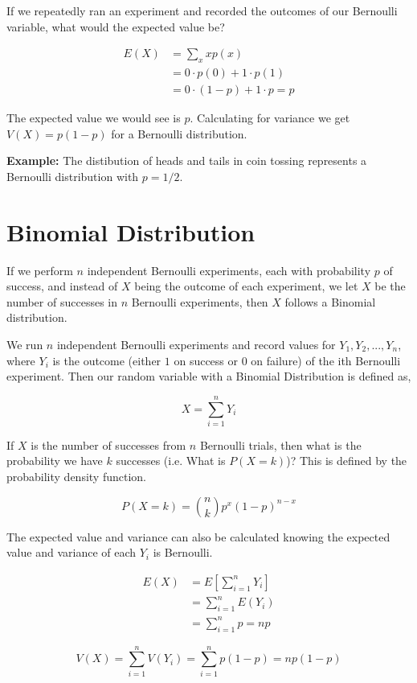 If we repeatedly ran an experiment and recorded the outcomes of our Bernoulli variable, what would the expected value be?

\begin{align*}
	E(X) & = \sum_{x}xp(x)\\
	& = 0\cdot p(0) + 1\cdot p(1) \\
	& = 0\cdot (1-p) + 1\cdot p = p
\end{align*}

The expected value we would see is $p$. Calculating for variance we get $V(X)=p(1-p)$ for a Bernoulli distribution.\newline \par

\textbf{Example:} The distibution of heads and tails in coin tossing represents a Bernoulli distribution with $p=1/2$.


\section{Binomial Distribution}
If we perform $n$ independent Bernoulli experiments, each with probability $p$ of success, and instead of $X$ being the outcome of each experiment, we let $X$ be the
number of successes in $n$ Bernoulli experiments, then $X$ follows a Binomial distribution.\newline \par

We run $n$ independent Bernoulli experiments and record values for $Y_1, Y_2, ..., Y_n$, where $Y_i$ is the outcome (either $1$ on success or $0$ on failure)
of the ith Bernoulli experiment. Then our random variable with a Binomial Distribution is defined as,

\begin{equation*}
	X = \sum_{i=1}^{n}Y_{i}
\end{equation*}

If $X$ is the number of successes from $n$ Bernoulli trials, then what is the probability we have $k$ successes (i.e. What is $P(X=k)$)? This
is defined by the probability density function.

\begin{equation*}
	P(X=k) = \binom{n}{k}p^{x}(1-p)^{n-x}
\end{equation*}

The expected value and variance can also be calculated knowing the expected value and variance of each $Y_i$ is Bernoulli.

\begin{align*}
	E(X) & = E\left [ \sum_{i=1}^{n}Y_{i} \right ] \\
	& = \sum_{i=1}^{n}E(Y_{i}) \\
	& = \sum_{i=1}^{n}p = np
\end{align*}

\begin{equation*}
	V(X) = \sum_{i=1}^{n} V(Y_{i}) = \sum_{i=1}^{n}p(1-p) = np(1-p)
\end{equation*}

